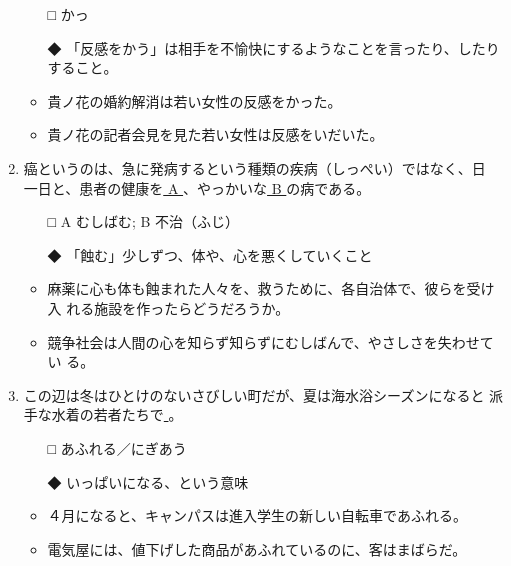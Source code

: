 \documentclass[
uplatex,
b5paper,
10pt,
dvipdfmx
]{jsbook}
\begin{document}
\begin{enumerate}
\begin{itemize}
\item[□] かっ
\item[◆] 「反感をかう」は相手を不愉快にするようなことを言ったり、したり
	  すること。
\end{itemize}
\begin{itemize}
\item 貴ノ花の婚約解消は若い女性の反感をかった。
\item 貴ノ花の記者会見を見た若い女性は反感をいだいた。
\end{itemize}


\item 癌というのは、急に発病するという種類の疾病（しっぺい）ではなく、日
      一日と、患者の健康を\underline{ A }、やっかいな\underline{ B }
      の病である。

\begin{itemize}
\item[□] A むしばむ; B 不治（ふじ）
\item[◆] 「蝕む」少しずつ、体や、心を悪くしていくこと
\end{itemize}

\begin{itemize}
\item 麻薬に心も体も蝕まれた人々を、救うために、各自治体で、彼らを受け入
      れる施設を作ったらどうだろうか。
\item 競争社会は人間の心を知らず知らずにむしばんで、やさしさを失わせてい
      る。
\end{itemize}

\item この辺は冬はひとけのないさびしい町だが、夏は海水浴シーズンになると
      派手な水着の若者たちで\underline{     }。
\begin{itemize}
\item[□] あふれる／にぎあう
\item[◆] いっぱいになる、という意味
\end{itemize}
\begin{itemize}
\item ４月になると、キャンパスは進入学生の新しい自転車であふれる。
\item 電気屋には、値下げした商品があふれているのに、客はまばらだ。
\end{itemize}


\end{enumerate}
\end{document}
